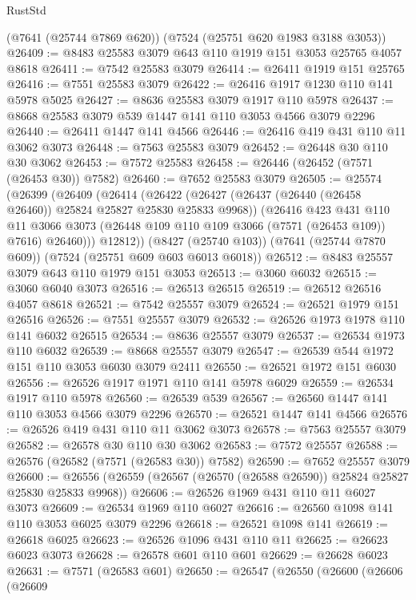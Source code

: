 \begin{lexlean}{RustStd}
\begin{coremodule}
    (@7641 (@25744 @7869 @620))
    (@7524 (@25751 @620 @1983 @3188 @3053))
@26409 := @8483 @25583 @3079 @643 @110 @1919 @151 @3053 @25765 @4057 @8618
@26411 := @7542 @25583 @3079
@26414 := @26411 @1919 @151 @25765
@26416 := @7551 @25583 @3079
@26422 := @26416 @1917 @1230 @110 @141 @5978 @5025
@26427 := @8636 @25583 @3079 @1917 @110 @5978
@26437 := @8668 @25583 @3079 @539 @1447 @141 @110 @3053 @4566 @3079 @2296
@26440 := @26411 @1447 @141 @4566
@26446 := @26416 @419 @431 @110 @11 @3062 @3073
@26448 := @7563 @25583 @3079
@26452 := @26448 @30 @110 @30 @3062
@26453 := @7572 @25583
@26458 := @26446 (@26452 (@7571 (@26453 @30)) @7582)
@26460 := @7652 @25583 @3079
@26505 := @25574
    (@26399
      (@26409
        (@26414
          (@26422
            (@26427 (@26437 (@26440 (@26458 @26460)) @25824 @25827 @25830 @25833 @9968))
            (@26416
              @423
              @431
              @110
              @11
              @3066
              @3073
              (@26448 @109 @110 @109 @3066 (@7571 (@26453 @109)) @7616)
              @26460)))
        @12812))
    (@8427 (@25740 @103))
    (@7641 (@25744 @7870 @609))
    (@7524 (@25751 @609 @603 @6013 @6018))
@26512 := @8483 @25557 @3079 @643 @110 @1979 @151 @3053
@26513 := @3060 @6032
@26515 := @3060 @6040 @3073
@26516 := @26513 @26515
@26519 := @26512 @26516 @4057 @8618
@26521 := @7542 @25557 @3079
@26524 := @26521 @1979 @151 @26516
@26526 := @7551 @25557 @3079
@26532 := @26526 @1973 @1978 @110 @141 @6032 @26515
@26534 := @8636 @25557 @3079
@26537 := @26534 @1973 @110 @6032
@26539 := @8668 @25557 @3079
@26547 := @26539 @544 @1972 @151 @110 @3053 @6030 @3079 @2411
@26550 := @26521 @1972 @151 @6030
@26556 := @26526 @1917 @1971 @110 @141 @5978 @6029
@26559 := @26534 @1917 @110 @5978
@26560 := @26539 @539
@26567 := @26560 @1447 @141 @110 @3053 @4566 @3079 @2296
@26570 := @26521 @1447 @141 @4566
@26576 := @26526 @419 @431 @110 @11 @3062 @3073
@26578 := @7563 @25557 @3079
@26582 := @26578 @30 @110 @30 @3062
@26583 := @7572 @25557
@26588 := @26576 (@26582 (@7571 (@26583 @30)) @7582)
@26590 := @7652 @25557 @3079
@26600 := @26556 (@26559 (@26567 (@26570 (@26588 @26590)) @25824 @25827 @25830 @25833 @9968))
@26606 := @26526 @1969 @431 @110 @11 @6027 @3073
@26609 := @26534 @1969 @110 @6027
@26616 := @26560 @1098 @141 @110 @3053 @6025 @3079 @2296
@26618 := @26521 @1098 @141
@26619 := @26618 @6025
@26623 := @26526 @1096 @431 @110 @11
@26625 := @26623 @6023 @3073
@26628 := @26578 @601 @110 @601
@26629 := @26628 @6023
@26631 := @7571 (@26583 @601)
@26650 := @26547
    (@26550
      (@26600
        (@26606
          (@26609

\end{coremodule}
\end{lexlean}
